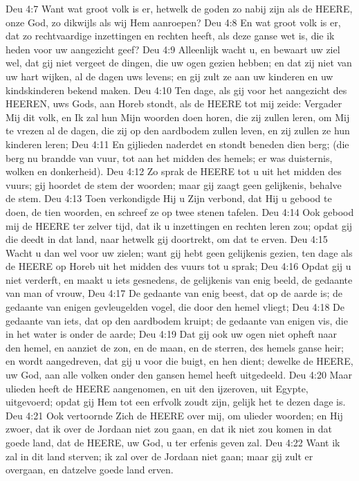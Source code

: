 Deu 4:7  Want wat groot volk is er, hetwelk de goden zo nabij zijn als de HEERE, onze God, zo dikwijls als wij Hem aanroepen?
Deu 4:8  En wat groot volk is er, dat zo rechtvaardige inzettingen en rechten heeft, als deze ganse wet is, die ik heden voor uw aangezicht geef?
Deu 4:9  Alleenlijk wacht u, en bewaart uw ziel wel, dat gij niet vergeet de dingen, die uw ogen gezien hebben; en dat zij niet van uw hart wijken, al de dagen uws levens; en gij zult ze aan uw kinderen en uw kindskinderen bekend maken.
Deu 4:10  Ten dage, als gij voor het aangezicht des HEEREN, uws Gods, aan Horeb stondt, als de HEERE tot mij zeide: Vergader Mij dit volk, en Ik zal hun Mijn woorden doen horen, die zij zullen leren, om Mij te vrezen al de dagen, die zij op den aardbodem zullen leven, en zij zullen ze hun kinderen leren;
Deu 4:11  En gijlieden naderdet en stondt beneden dien berg; (die berg nu brandde van vuur, tot aan het midden des hemels; er was duisternis, wolken en donkerheid).
Deu 4:12  Zo sprak de HEERE tot u uit het midden des vuurs; gij hoordet de stem der woorden; maar gij zaagt geen gelijkenis, behalve de stem.
Deu 4:13  Toen verkondigde Hij u Zijn verbond, dat Hij u gebood te doen, de tien woorden, en schreef ze op twee stenen tafelen.
Deu 4:14  Ook gebood mij de HEERE ter zelver tijd, dat ik u inzettingen en rechten leren zou; opdat gij die deedt in dat land, naar hetwelk gij doortrekt, om dat te erven.
Deu 4:15  Wacht u dan wel voor uw zielen; want gij hebt geen gelijkenis gezien, ten dage als de HEERE op Horeb uit het midden des vuurs tot u sprak;
Deu 4:16  Opdat gij u niet verderft, en maakt u iets gesnedens, de gelijkenis van enig beeld, de gedaante van man of vrouw,
Deu 4:17  De gedaante van enig beest, dat op de aarde is; de gedaante van enigen gevleugelden vogel, die door den hemel vliegt;
Deu 4:18  De gedaante van iets, dat op den aardbodem kruipt; de gedaante van enigen vis, die in het water is onder de aarde;
Deu 4:19  Dat gij ook uw ogen niet opheft naar den hemel, en aanziet de zon, en de maan, en de sterren, des hemels ganse heir; en wordt aangedreven, dat gij u voor die buigt, en hen dient; dewelke de HEERE, uw God, aan alle volken onder den gansen hemel heeft uitgedeeld.
Deu 4:20  Maar ulieden heeft de HEERE aangenomen, en uit den ijzeroven, uit Egypte, uitgevoerd; opdat gij Hem tot een erfvolk zoudt zijn, gelijk het te dezen dage is.
Deu 4:21  Ook vertoornde Zich de HEERE over mij, om ulieder woorden; en Hij zwoer, dat ik over de Jordaan niet zou gaan, en dat ik niet zou komen in dat goede land, dat de HEERE, uw God, u ter erfenis geven zal.
Deu 4:22  Want ik zal in dit land sterven; ik zal over de Jordaan niet gaan; maar gij zult er overgaan, en datzelve goede land erven.
